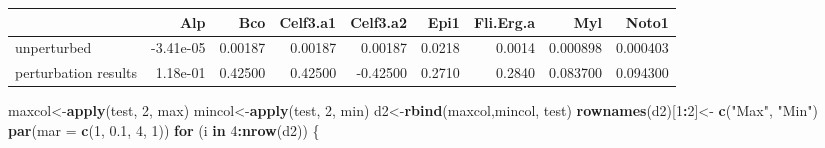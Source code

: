 \documentclass[
]{book}
\newenvironment{Shaded}{\begin{snugshade}}{\end{snugshade}}
\newcommand{\ControlFlowTok}[1]{\textcolor[rgb]{0.13,0.29,0.53}{\textbf{#1}}}
\newcommand{\DataTypeTok}[1]{\textcolor[rgb]{0.13,0.29,0.53}{#1}}
\newcommand{\DecValTok}[1]{\textcolor[rgb]{0.00,0.00,0.81}{#1}}
\newcommand{\FloatTok}[1]{\textcolor[rgb]{0.00,0.00,0.81}{#1}}
\newcommand{\KeywordTok}[1]{\textcolor[rgb]{0.13,0.29,0.53}{\textbf{#1}}}
\newcommand{\NormalTok}[1]{#1}
\newcommand{\OperatorTok}[1]{\textcolor[rgb]{0.81,0.36,0.00}{\textbf{#1}}}
\newcommand{\StringTok}[1]{\textcolor[rgb]{0.31,0.60,0.02}{#1}}
\begin{document}
\begin{table}
\centering\begingroup\fontsize{8}{10}\selectfont

\begin{tabular}{l|r|r|r|r|r|r|r|r}
\hline
  & Alp & Bco & Celf3.a1 & Celf3.a2 & Epi1 & Fli.Erg.a & Myl & Noto1\\
\hline
unperturbed & -3.41e-05 & 0.00187 & 0.00187 & 0.00187 & 0.0218 & 0.0014 & 0.000898 & 0.000403\\
\hline
perturbation results & 1.18e-01 & 0.42500 & 0.42500 & -0.42500 & 0.2710 & 0.2840 & 0.083700 & 0.094300\\
\hline
\end{tabular}
\endgroup{}
\end{table}

\begin{Shaded}
\begin{Highlighting}[]
\NormalTok{maxcol<-}\KeywordTok{apply}\NormalTok{(test, }\DecValTok{2}\NormalTok{, max)}
\NormalTok{mincol<-}\KeywordTok{apply}\NormalTok{(test, }\DecValTok{2}\NormalTok{, min)}
\NormalTok{d2<-}\KeywordTok{rbind}\NormalTok{(maxcol,mincol, test)}
\KeywordTok{rownames}\NormalTok{(d2)[}\DecValTok{1}\OperatorTok{:}\DecValTok{2}\NormalTok{]<-}\StringTok{ }\KeywordTok{c}\NormalTok{(}\StringTok{"Max"}\NormalTok{, }\StringTok{"Min"}\NormalTok{)}
\KeywordTok{par}\NormalTok{(}\DataTypeTok{mar =} \KeywordTok{c}\NormalTok{(}\DecValTok{1}\NormalTok{, }\FloatTok{0.1}\NormalTok{, }\DecValTok{4}\NormalTok{, }\DecValTok{1}\NormalTok{))}
\ControlFlowTok{for}\NormalTok{ (i }\ControlFlowTok{in} \DecValTok{4}\OperatorTok{:}\KeywordTok{nrow}\NormalTok{(d2)) \{}

\end{Highlighting}
\end{Shaded}
\end{document}
